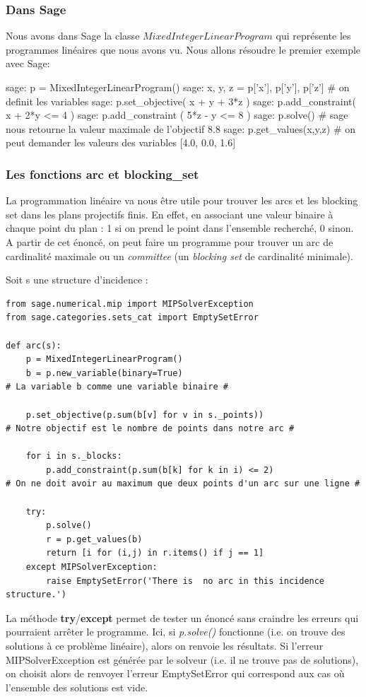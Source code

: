 \documentclass[a4paper]{article}
\begin{document}
\subsubsection*{Dans Sage}
Nous avons dans Sage la classe $MixedIntegerLinearProgram$ qui représente les programmes linéaires que nous avons vu.
Nous allons résoudre le premier exemple avec Sage:
\begin{sageverbatim}
sage: p = MixedIntegerLinearProgram()
sage: x, y, z = p['x'], p['y'], p['z']    # on definit les variables
sage: p.set_objective( x + y + 3*z )
sage: p.add_constraint( x + 2*y <= 4 )
sage: p.add_constraint ( 5*z - y <= 8 )
sage: p.solve()         # sage nous retourne la valeur maximale de l'objectif
8.8
sage: p.get_values(x,y,z)    # on peut demander les valeurs des variables
[4.0, 0.0, 1.6]
\end{sageverbatim}
\subsubsection*{Les fonctions arc et blocking\_set}
La programmation linéaire va nous être utile pour trouver les arcs et les blocking set dans les plans projectifs finis. En effet, en associant une valeur binaire à chaque point du plan : 1 si on prend le point dans l'ensemble recherché, 0 sinon.\\
A partir de cet énoncé, on peut faire un programme pour trouver un arc de cardinalité maximale ou un \textit{committee} (un \textit{blocking set} de cardinalité minimale).

Soit s une structure d'incidence :

\begin{lstlisting}
from sage.numerical.mip import MIPSolverException
from sage.categories.sets_cat import EmptySetError
          
def arc(s):   
    p = MixedIntegerLinearProgram()
    b = p.new_variable(binary=True)
# La variable b comme une variable binaire #

    p.set_objective(p.sum(b[v] for v in s._points))
# Notre objectif est le nombre de points dans notre arc #

    for i in s._blocks:
        p.add_constraint(p.sum(b[k] for k in i) <= 2)
# On ne doit avoir au maximum que deux points d'un arc sur une ligne #
        
    try:
        p.solve()
        r = p.get_values(b)
        return [i for (i,j) in r.items() if j == 1]
    except MIPSolverException:
        raise EmptySetError('There is  no arc in this incidence structure.')
\end{lstlisting}
La méthode \textbf{try}/\textbf{except} permet de tester un énoncé sans craindre les erreurs qui pourraient arrêter le programme. Ici, si \textit{p.solve()} fonctionne (i.e. on trouve des solutions à ce problème linéaire), alors on renvoie les résultats. Si l'erreur MIPSolverException est générée par le solveur (i.e. il ne trouve pas de solutions), on choisit alors de renvoyer l'erreur EmptySetError qui correspond aux cas où l'ensemble des solutions est vide.
\end{document}
